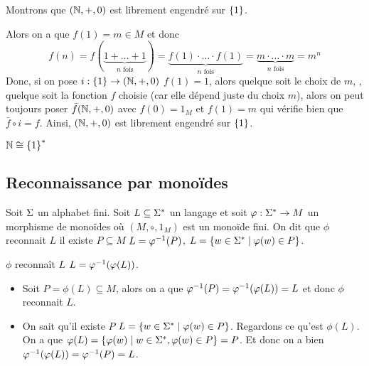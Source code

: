 \begin{exemple}
	Montrons que $(\mathbb{N}, + , 0)$ est librement engendré sur $\left\{1\right\}$.


	Alors on a que $f(1) = m \in M$ et donc
	$$f(n) =  f(\underbrace{1+\ldots+1}_{n \text{ fois}}) = \underbrace{f(1)\cdot\ldots\cdot f(1)}_{n \text{ fois}} = \underbrace{m\cdot\ldots\cdot m}_{n \text{ fois}} = m^n$$
	Donc, si on pose $i: \left\{1\right\} \to (\mathbb{N}, +, 0)$ \tq $f(1) = 1$, alors quelque soit le choix de $m$, \ie, quelque soit la fonction $f$ choisie (car elle dépend juste du choix $m$), alors
	on peut toujours poser $\bar f (\mathbb{N}, +, 0)$ avec $f(0) = 1_M$ et $f(1) = m$ qui vérifie bien que $\bar f \circ i = f$. Ainsi, $(\mathbb{N}, +, 0)$ est librement engendré sur $\left\{1\right\}$.
\end{exemple}

\begin{remarque}
	$\mathbb{N} \cong \left\{1\right\}^*$
\end{remarque}

\subsection{Reconnaissance par monoïdes}

\begin{definition}
	Soit $\Sigma$ un alphabet fini. Soit $L \subseteq \Sigma^{*}$ un langage et soit $\varphi : \Sigma^{*} \to M$ un morphisme de monoïdes où $(M, \circ, 1_M)$ est un monoïde fini. On dit que
	$\phi$ reconnait $L$ \ssi il existe $P \subseteq M$ \tq $L = \varphi^{-1} (P)$, \cad $L = \left\{w \in \Sigma^{*} \mid \varphi (w) \in P\right\}$.
\end{definition}

\begin{exercice}
	$\phi$ reconnaît $L$ \ssi $L = \varphi^{-1} (\varphi (L))$.
\end{exercice}

\begin{proofI}
	\begin{itemize}
		\item \bimpRL

		      Soit $P = \phi(L) \subseteq M$, alors on a que $\varphi^{-1} (P) = \varphi^{-1} (\varphi (L)) = L$ et donc $\phi$ reconnait $L$.

		\item \bimpLR

		      On sait qu'il existe $P$ \tq $L = \left\{w \in \Sigma^{*} \mid \varphi(w) \in P\right\}$. Regardons ce qu'est $\phi (L)$.
		      On a que $\varphi (L) = \left\{\varphi (w) \mid w \in \Sigma^{*}, \varphi(w) \in P\right\} = P$. Et donc on a bien $\varphi^{-1} (\varphi (L)) = \varphi^{-1} (P) = L$.
	\end{itemize}
\end{proofI}

